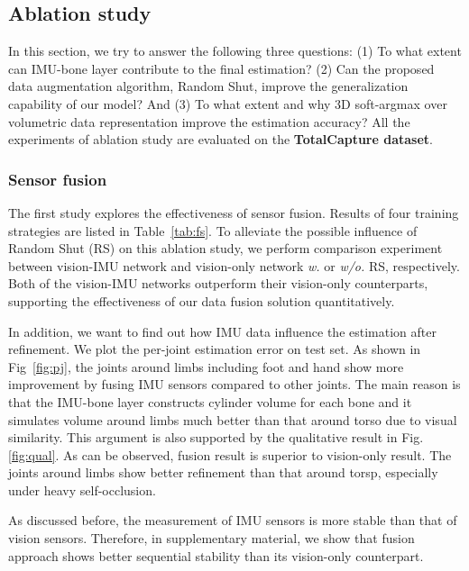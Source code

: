 \documentclass[10pt,twocolumn,letterpaper]{article}
\begin{document}
\vspace*{-4pt}
\subsection{Ablation study}
\vspace*{-4pt}
In this section, we try to answer the following three questions: (1) To what extent can IMU-bone layer contribute to the final estimation?  (2) Can the proposed data augmentation algorithm, Random Shut, improve the generalization capability of our model? And (3) To what extent and why 3D soft-argmax over volumetric data representation improve the estimation accuracy? All the experiments of ablation study are evaluated on the \textbf{TotalCapture dataset}\cite{Trumble:BMVC:2017}.

\vspace{-0.5cm}
\subsubsection{Sensor fusion}
\label{sec:fusion}

The first study explores the effectiveness of sensor fusion. Results of four training strategies are listed in Table~\ref{tab:fs}. To alleviate the possible influence of Random Shut (RS) on this ablation study, we perform comparison experiment between vision-IMU network and vision-only network \textit{w.} or \textit{w/o.} RS, respectively. Both of the vision-IMU networks outperform their vision-only counterparts, supporting the effectiveness of our data fusion solution quantitatively. 

In addition, we want to find out how IMU data influence the estimation after refinement. We plot the per-joint estimation error on test set. As shown in Fig~\ref{fig:pj}, the joints around limbs including foot and hand show more improvement by fusing IMU sensors compared to other joints. The main reason is that the IMU-bone layer constructs cylinder volume for each bone and it simulates volume around limbs much better than that around torso due to visual similarity. This argument is also supported by the qualitative result in Fig.\ref{fig:qual}. As can be observed, fusion result is superior to vision-only result. The joints around limbs show better refinement than that around torsp, especially under heavy self-occlusion.

As discussed before, the measurement of IMU sensors is more stable than that of vision sensors. Therefore, in supplementary material, we show that fusion approach shows better sequential stability than its vision-only counterpart. 
\end{document}
